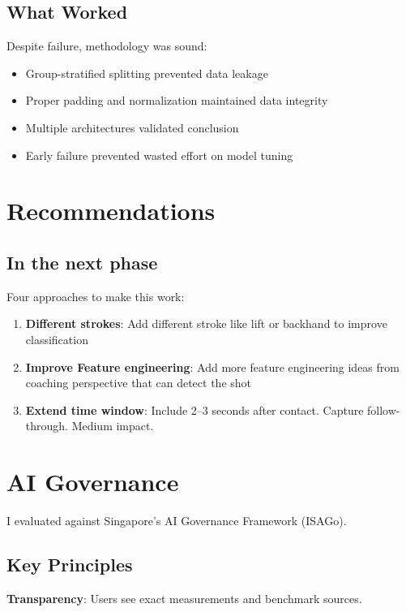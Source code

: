 \documentclass[11pt,a4paper]{article}
\begin{document}
\subsection{What Worked}

Despite failure, methodology was sound:
\begin{itemize}
\item Group-stratified splitting prevented data leakage
\item Proper padding and normalization maintained data integrity
\item Multiple architectures validated conclusion
\item Early failure prevented wasted effort on model tuning
\end{itemize}

\section{Recommendations}

\subsection{In the next phase}

Four approaches to make this work:

\begin{enumerate}
\item \textbf{Different strokes}: Add different stroke like lift or backhand to improve classification 
\item \textbf{Improve Feature engineering}: Add more feature engineering ideas from coaching perspective that can detect the shot
\item \textbf{Extend time window}: Include 2--3 seconds after contact. Capture follow-through. Medium impact.
\end{enumerate}


\section{AI Governance}

I evaluated against Singapore's AI Governance Framework (ISAGo).

\subsection{Key Principles}

\textbf{Transparency}: Users see exact measurements and benchmark sources.
\end{document}
